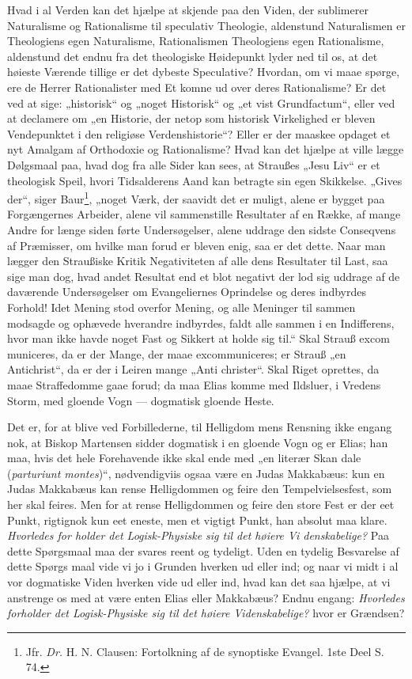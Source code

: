 \documentclass[12pt]{book}
\newcommand{\opage}[1]{\marginnote{\footnotesize\textit{[#1]}}}
\begin{document}
Hvad i al Verden kan det hjælpe at skjende paa den
Viden, der sublimerer Naturalisme og Rationalisme til speculativ
Theologie, aldenstund Naturalismen er Theologiens
egen Naturalisme, Rationalismen Theologiens egen Rationalisme,
aldenstund det endnu fra det theologiske Høidepunkt
lyder ned til os, at det høieste Værende tillige er det dybeste
Speculative? Hvordan, om vi maae spørge, ere de Herrer
Rationalister med Et komne ud over deres Rationalisme?
Er det ved at sige: „historisk“ og „noget Historisk“ og „et vist
Grundfactum“, eller ved at declamere om „en Historie, der
netop som historisk Virkelighed er bleven Vendepunktet i den
religiøse Verdenshistorie“? Eller er der maaskee opdaget et nyt
Amalgam af Orthodoxie og Rationalisme? Hvad kan det
hjælpe at ville lægge Dølgsmaal paa, hvad dog fra alle
Sider kan sees, at Straußes „Jesu Liv“ er et theologisk
Speil, hvori Tidsalderens Aand kan betragte sin egen Skikkelse.
„Gives der“, siger Baur\footnote{Jfr. \textit{Dr.} H. N. Clausen: Fortolkning af de synoptiske Evangel.
1ste Deel S. 74.}, „noget Værk, der saavidt
det er muligt, alene er bygget paa Forgængernes Arbeider,
alene vil sammenstille Resultater af en Række, af mange
Andre for længe siden førte Undersøgelser, alene uddrage den
sidste Conseqvens af Præmisser, om hvilke man forud er
bleven enig, saa er det dette. Naar man lægger den
Straußiske Kritik Negativiteten af alle dens Resultater til
Last, saa sige man dog, hvad andet Resultat end et blot
negativt der lod sig uddrage af de daværende Undersøgelser
om Evangeliernes Oprindelse og deres indbyrdes Forhold!
\opage{67}\setcounter{footnote}{0}%
Idet Mening stod overfor Mening, og alle Meninger til\-%
sammen modsagde og ophævede hverandre indbyrdes, faldt
alle sammen i en Indifferens, hvor man ikke havde noget
Fast og Sikkert at holde sig til.“ Skal Strauß excom\-%
municeres, da er der Mange, der maae excommuniceres; er
Strauß „en Antichrist“, da er der i Leiren mange „Anti\-%
christer“. Skal Riget oprettes, da maae Straffedomme gaae
forud; da maa Elias komme med Ildsluer, i Vredens
Storm, med gloende Vogn --- dogmatisk gloende Heste.

Det er, for at blive ved Forbillederne, til Helligdom\-%
mens Rensning ikke engang nok, at Biskop Martensen sidder
dogmatisk i en gloende Vogn og er Elias; han maa, hvis
det hele Forehavende ikke skal ende med „en literær Skan\-%
dale (\textit{parturiunt montes})“, nødvendigviis ogsaa være en
Judas Makkabæus: kun en Judas Makkabæus kan rense
Helligdommen og feire den Tempelvielsesfest, som her skal
feires. Men for at rense Helligdommen og feire den
store Fest er der eet Punkt, rigtignok kun eet eneste, men
et vigtigt Punkt, han absolut maa klare. \emph{Hvorledes for\-%
holder det Logisk-Physiske sig til det høiere Vi\-%
denskabelige?} Paa dette Spørgsmaal maa der svares
reent og tydeligt. Uden en tydelig Besvarelse af dette Spørgs\-%
maal vide vi jo i Grunden hverken ud eller ind; og naar
vi midt i al vor dogmatiske Viden hverken vide ud eller ind,
hvad kan det saa hjælpe, at vi anstrenge os med at være
enten Elias eller Makkabæus? Endnu engang: \emph{Hvorledes
forholder det Logisk-Physiske sig til det høiere
Videnskabelige?} hvor er Grændsen?
\end{document}
